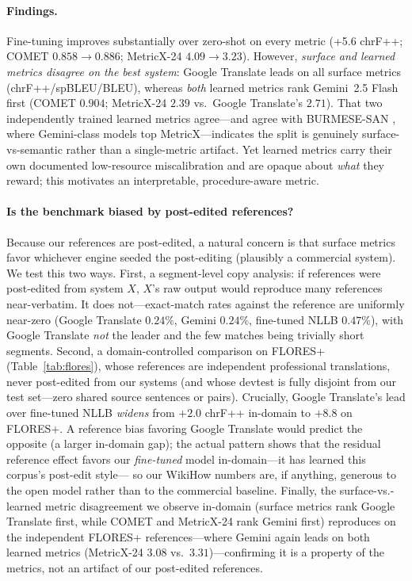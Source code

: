 \documentclass[11pt]{article}
\begin{document}


\paragraph{Findings.} Fine-tuning improves substantially over zero-shot on every metric
(+5.6 chrF++; COMET $0.858\rightarrow0.886$; MetricX-24 $4.09\rightarrow3.23$).
However, \emph{surface and learned metrics disagree on the best system}: Google Translate
leads on all surface metrics (chrF++/spBLEU/BLEU), whereas \emph{both} learned metrics rank
Gemini~2.5 Flash first (COMET $0.904$; MetricX-24 $2.39$ vs.\ Google Translate's $2.71$).
That two independently trained learned metrics agree---and agree with BURMESE-SAN
\citep{burmesesan2026}, where Gemini-class models top MetricX---indicates the split is
genuinely surface-vs-semantic rather than a single-metric artifact. Yet learned metrics carry
their own documented low-resource miscalibration \citep{falcao2024comet,africomet2024} and are
opaque about \emph{what} they reward; this motivates an interpretable, procedure-aware metric.

\paragraph{Is the benchmark biased by post-edited references?} Because our references are
post-edited, a natural concern is that surface metrics favor whichever engine seeded the
post-editing (plausibly a commercial system). We test this two ways. First, a segment-level
copy analysis: if references were post-edited from system $X$, $X$'s raw output would
reproduce many references near-verbatim. It does not---exact-match rates against the reference
are uniformly near-zero (Google Translate $0.24\%$, Gemini $0.24\%$, fine-tuned NLLB
$0.47\%$), with Google Translate \emph{not} the leader and the few matches being trivially
short segments. Second, a domain-controlled comparison on FLORES+ (Table~\ref{tab:flores}),
whose references are independent professional translations, never post-edited from our systems
(and whose devtest is fully disjoint from our test set---zero shared source sentences or pairs).
Crucially, Google Translate's lead over fine-tuned NLLB \emph{widens} from $+2.0$ chrF++
in-domain to $+8.8$ on FLORES+. A reference bias favoring Google Translate would predict the
opposite (a larger in-domain gap); the actual pattern shows that the residual reference effect
favors our \emph{fine-tuned} model in-domain---it has learned this corpus's post-edit style---
so our WikiHow numbers are, if anything, generous to the open model rather than to the
commercial baseline. Finally, the surface-vs.-learned metric disagreement we observe
in-domain (surface metrics rank Google Translate first, while COMET and MetricX-24 rank
Gemini first) reproduces on the independent FLORES+ references---where Gemini again leads on
both learned metrics (MetricX-24 $3.08$ vs.\ $3.31$)---confirming it is a property of the
metrics, not an artifact of our post-edited references.
\end{document}
